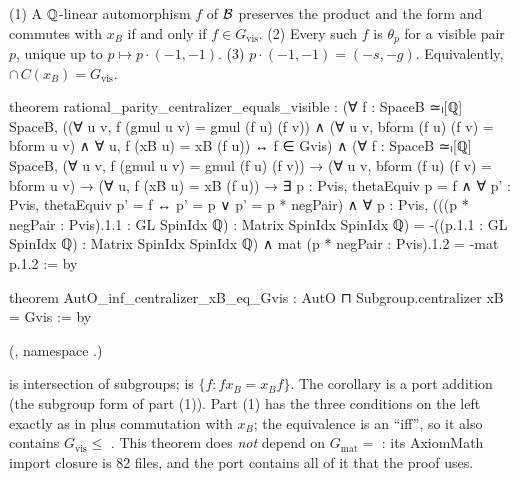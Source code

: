 \begin{theorem}\label{ch21:thm:parity}
(1) A ${\mathbb{Q}}$-linear automorphism $f$ of $\mathcal{B}$ preserves the product and the form and commutes with
$x_B$ if and only if $f\in G_{\mathrm{vis}}$.  (2) Every such $f$ is $\theta_p$ for a visible pair $p$,
unique up to $p\mapsto p\cdot(-1,-1)$.  (3) $p\cdot(-1,-1)=(-s,-g)$.  Equivalently,
 $\cap\,C(x_B)=G_{\mathrm{vis}}$.
\end{theorem}
\begin{leancode}
theorem rational_parity_centralizer_equals_visible :
    (∀ f : SpaceB ≃ₗ[ℚ] SpaceB, ((∀ u v, f (gmul u v) = gmul (f u) (f v)) ∧
        (∀ u v, bform (f u) (f v) = bform u v) ∧ ∀ u, f (xB u) = xB (f u)) ↔ f ∈ Gvis) ∧
    (∀ f : SpaceB ≃ₗ[ℚ] SpaceB, (∀ u v, f (gmul u v) = gmul (f u) (f v)) →
      (∀ u v, bform (f u) (f v) = bform u v) → (∀ u, f (xB u) = xB (f u)) →
      ∃ p : Pvis, thetaEquiv p = f ∧
        ∀ p' : Pvis, thetaEquiv p' = f ↔ p' = p ∨ p' = p * negPair) ∧
    ∀ p : Pvis, (((p * negPair : Pvis).1.1 : GL SpinIdx ℚ) : Matrix SpinIdx SpinIdx ℚ) =
        -((p.1.1 : GL SpinIdx ℚ) : Matrix SpinIdx SpinIdx ℚ) ∧
      mat (p * negPair : Pvis).1.2 = -mat p.1.2 := by
\end{leancode}
\begin{leancode}
theorem AutO_inf_centralizer_xB_eq_Gvis :
    AutO ⊓ Subgroup.centralizer {xB} = Gvis := by
\end{leancode}
(, namespace .)
\begin{dictionary}
 is intersection of subgroups;  is $\{f: fx_B=x_Bf\}$.  The
corollary is a port addition (the subgroup form of part (1)).  Part (1) has the three conditions on the
left exactly as in  plus commutation with $x_B$; the equivalence is an ``iff'', so it also
contains $G_{\mathrm{vis}}\le$ .  This theorem does \emph{not} depend on
$G_{\mathrm{mat}}=$ : its AxiomMath import closure is $82$ files, and the port contains all of
it that the proof uses.
\end{dictionary}
